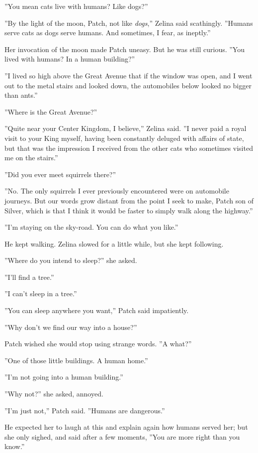 \documentclass[12pt]{book}
\begin{document}
 ''You mean cats live with humans? Like dogs?''\par
 ''By the light of the moon, Patch, not like {\it dogs},'' Zelina said scathingly. ''Humans serve cats as dogs serve humans. And sometimes, I fear, as ineptly.''\par
 Her invocation of the moon made Patch uneasy. But he was still curious. ''You lived with humans? In a human building?''\par
 ''I lived so high above the Great Avenue that if the window was open, and I went out to the metal stairs and looked down, the automobiles below looked no bigger than ants.''\par
 ''Where is the Great Avenue?''\par
 ''Quite near your Center Kingdom, I believe,'' Zelina said. ''I never paid a royal visit to your King myself, having been constantly deluged with affairs of state, but that was the impression I received from the other cats who sometimes visited me on the stairs.''\par
 ''Did you ever meet squirrels there?''\par
 ''No. The only squirrels I ever previously encountered were on automobile journeys. But our words grow distant from the point I seek to make, Patch son of Silver, which is that I think it would be faster to simply walk along the highway.''\par
 ''I'm staying on the sky-road. You can do what you like.''\par
 He kept walking. Zelina slowed for a little while, but she kept following.\par
 ''Where do you intend to sleep?'' she asked.\par
 ''I'll find a tree.''\par
 ''I can't sleep in a tree.''\par
 ''You can sleep anywhere you want,'' Patch said impatiently.\par
 ''Why don't we find our way into a house?''\par
 Patch wished she would stop using strange words. ''A what?''\par
 ''One of those little buildings. A human home.''\par
 ''I'm not going into a human building.''\par
 ''Why not?'' she asked, annoyed.\par
 ''I'm just not,'' Patch said. ''Humans are dangerous.''\par
 He expected her to laugh at this and explain again how humans served her; but she only sighed, and said after a few moments, ''You are more right than you know.''\par
\end{document}
